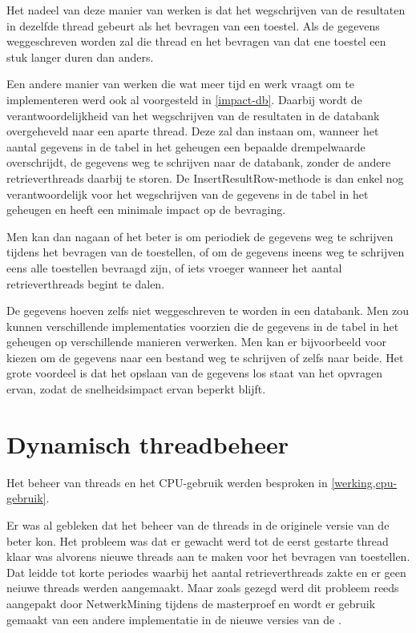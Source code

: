 Het nadeel van deze manier van werken is dat het wegschrijven van de resultaten in dezelfde thread gebeurt als het bevragen van een toestel.
Als de gegevens weggeschreven worden zal die thread en het bevragen van dat ene toestel een stuk langer duren dan anders.

Een andere manier van werken die wat meer tijd en werk vraagt om te implementeren werd ook al voorgesteld in \cref{impact-db}.
Daarbij wordt de verantwoordelijkheid van het wegschrijven van de resultaten in de databank overgeheveld naar een aparte thread.
Deze zal dan instaan om, wanneer het aantal gegevens in de tabel in het geheugen een bepaalde drempelwaarde overschrijdt,
de gegevens weg te schrijven naar de databank, zonder de andere retrieverthreads daarbij te storen.
De InsertResultRow-methode is dan enkel nog verantwoordelijk voor het wegschrijven van de gegevens in de tabel in het geheugen en heeft een minimale impact op de bevraging.

Men kan dan nagaan of het beter is om periodiek de gegevens weg te schrijven tijdens het bevragen van de toestellen,
of om de gegevens ineens weg te schrijven eens alle toestellen bevraagd zijn, of iets vroeger wanneer het aantal retrieverthreads begint te dalen.

De gegevens hoeven zelfs niet weggeschreven te worden in een databank.
Men zou kunnen verschillende implementaties voorzien die de gegevens in de tabel in het geheugen op verschillende manieren verwerken.
Men kan er bijvoorbeeld voor kiezen om de gegevens naar een bestand weg te schrijven of zelfs naar beide.
Het grote voordeel is dat het opslaan van de gegevens los staat van het opvragen ervan, zodat de snelheidsimpact ervan beperkt blijft.


\section{Dynamisch threadbeheer}

Het beheer van threads en het CPU-gebruik werden besproken in \cref{werking,cpu-gebruik}.

Er was al gebleken dat het beheer van de threads in de originele versie van de \nwmretriever{} beter kon.
Het probleem was dat er gewacht werd tot de eerst gestarte thread klaar was alvorens nieuwe threads aan te maken voor het bevragen van toestellen.
Dat leidde tot korte periodes waarbij het aantal retrieverthreads zakte en er geen neiuwe threads werden aangemaakt.
Maar zoals gezegd werd dit probleem reeds aangepakt door NetwerkMining tijdens de masterproef en
wordt er gebruik gemaakt van een andere implementatie in de nieuwe versies van de \nwmretriever{}.

